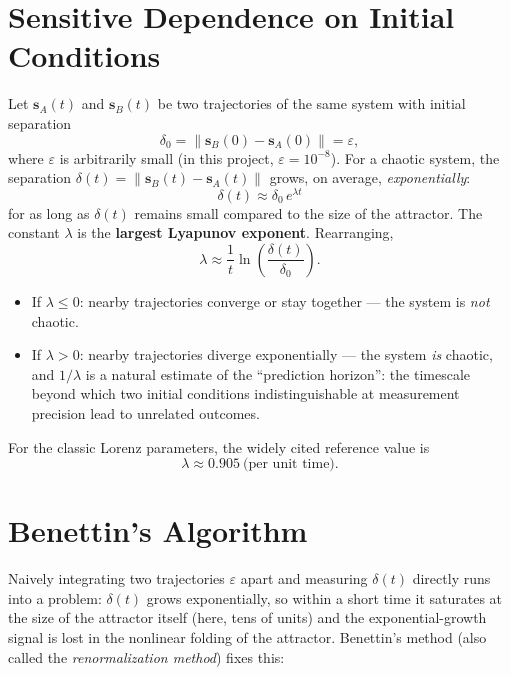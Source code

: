 \documentclass[11pt]{article}
\begin{document}
\section{Sensitive Dependence on Initial Conditions}

Let $\mathbf{s}_A(t)$ and $\mathbf{s}_B(t)$ be two trajectories of the same
system with initial separation
\[
\delta_0 = \lVert \mathbf{s}_B(0) - \mathbf{s}_A(0) \rVert = \varepsilon,
\]
where $\varepsilon$ is arbitrarily small (in this project, $\varepsilon =
10^{-8}$). For a chaotic system, the separation
$\delta(t) = \lVert \mathbf{s}_B(t) - \mathbf{s}_A(t) \rVert$ grows, on
average, \emph{exponentially}:
\[
\delta(t) \approx \delta_0\, e^{\lambda t}
\]
for as long as $\delta(t)$ remains small compared to the size of the
attractor. The constant $\lambda$ is the \textbf{largest Lyapunov
exponent}. Rearranging,
\[
\lambda \approx \frac{1}{t} \ln\!\left(\frac{\delta(t)}{\delta_0}\right).
\]

\begin{itemize}
  \item If $\lambda \le 0$: nearby trajectories converge or stay together — the system is \emph{not} chaotic.
  \item If $\lambda > 0$: nearby trajectories diverge exponentially — the system \emph{is} chaotic, and $1/\lambda$ is a natural estimate of the ``prediction horizon'': the timescale beyond which two initial conditions indistinguishable at measurement precision lead to unrelated outcomes.
\end{itemize}

For the classic Lorenz parameters, the widely cited reference value is
\[
\lambda \approx 0.905\ \text{(per unit time)}.
\]

\section{Benettin's Algorithm}

Naively integrating two trajectories $\varepsilon$ apart and measuring
$\delta(t)$ directly runs into a problem: $\delta(t)$ grows exponentially,
so within a short time it saturates at the size of the attractor itself
(here, tens of units) and the exponential-growth signal is lost in the
nonlinear folding of the attractor. Benettin's method (also called the
\emph{renormalization method}) fixes this:
\end{document}

